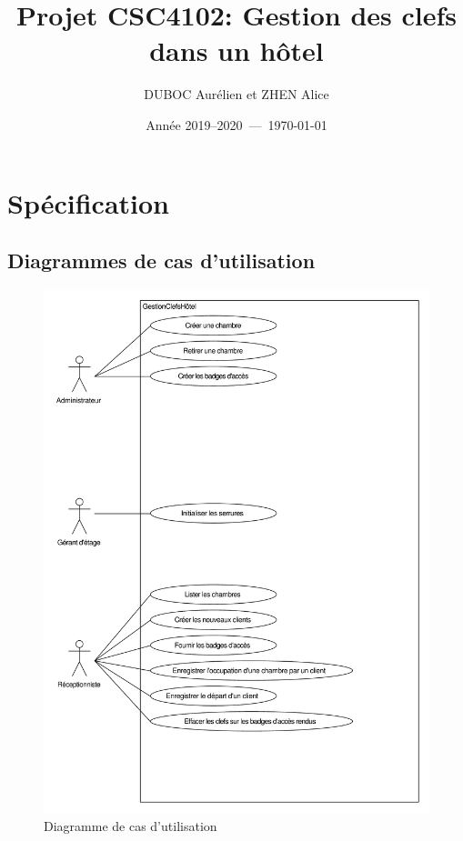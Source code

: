 \documentclass[11pt,article]{article}
\begin{document}
\title{Projet CSC4102: Gestion des clefs dans un hôtel}
\author{DUBOC Aurélien et ZHEN Alice}
\date{Année 2019--2020~---~\today}
\maketitle

\newpage

\tableofcontents

\newpage

\section{Spécification}

\subsection{Diagrammes de cas d'utilisation}

\begin{figure}[h!]
\begin{center}
\includegraphics[scale=0.5]{DiagrammesDeCasDUtilisation/gestionclefshotel_uml_diag_cas_utilisation}
\caption{Diagramme de cas d'utilisation}
\end{center}
\label{umlet_diag_cas_utilisation}
\end{figure}
\end{document}
